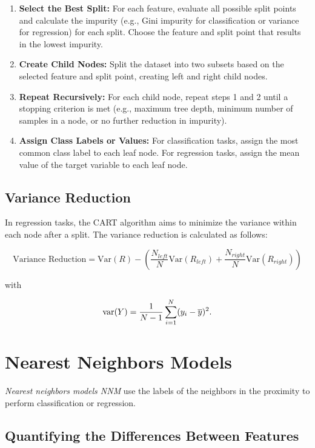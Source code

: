 \begin{enumerate}

	\item \textbf{Select the Best Split:} For each feature, evaluate all possible split points and calculate the impurity (e.g., Gini impurity for classification or variance for regression)
	      for each split. Choose the feature and split point that results in the lowest impurity.

	\item \textbf{Create Child Nodes:} Split the dataset into two subsets based on the selected feature and split point, creating left and right child nodes.

	\item \textbf{Repeat Recursively:} For each child node, repeat steps 1 and 2 until a stopping criterion is met (e.g., maximum tree depth, minimum number of samples in a node, or no further reduction in impurity).

	\item \textbf{Assign Class Labels or Values:} For classification tasks, assign the most common class label to each leaf node. For regression tasks, assign the mean value of the target variable to each leaf node.

\end{enumerate}

\subsection{Variance Reduction}

In regression tasks, the CART algorithm aims to minimize the variance within each node after a split. The variance reduction is calculated as follows:

\[
	\text{Variance Reduction} = \text{Var}(R) - \left( \frac{N_{left}}{N} \text{Var}(R_{left}) + \frac{N_{right}}{N} \text{Var}(R_{right}) \right)
\]

with

\[
	\mathrm{var} (Y) = \frac{1}{N - 1} \sum_{i = 1}^{N} (y_i - \overline{y})^2.
\]

\section{Nearest Neighbors Models}

\emph{Nearest neighbors models NNM} use the labels of the neighbors in the proximity to perform classification or regression.

\subsection{Quantifying the Differences Between Features}

